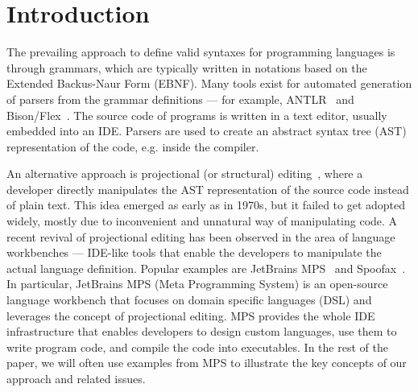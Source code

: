 \section{Introduction}

The prevailing approach to define valid syntaxes for programming languages is through grammars, which are typically written in notations based on the Extended Backus-Naur Form (EBNF).
Many tools exist for automated generation of parsers from the grammar definitions --- for example, ANTLR~\cite{ref:ANTLRBOOK,ref:ANTLR} and Bison/Flex~\cite{ref:BISONFLEX}.
The source code of programs is written in a text editor, usually embedded into an IDE. Parsers are used to create an abstract syntax tree (AST) representation of the code, e.g. inside the compiler.

An alternative approach is projectional (or structural) editing~\cite{ref:VWK15,ref:VSB14,ref:DHL80}, where a developer directly manipulates the AST representation of the source code instead of plain text.
This idea emerged as early as in 1970s, but it failed to get adopted widely, mostly due to inconvenient and unnatural way of manipulating code.
A recent revival of projectional editing has been observed in the area of language workbenches --- IDE-like tools that enable the developers to manipulate the actual language definition.
Popular examples are JetBrains MPS~\cite{ref:MPS,ref:MPSBOOK} and Spoofax~\cite{ref:KV10}.
In particular, JetBrains MPS (Meta Programming System) is an open-source language workbench that focuses on domain specific languages (DSL) and leverages the concept of projectional editing.
MPS provides the whole IDE infrastructure that enables developers to design custom languages, use them to write program code, and compile the code into executables.
In the rest of the paper, we will often use examples from MPS to illustrate the key concepts of our approach and related issues.



